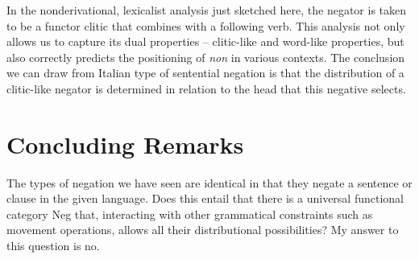 \documentclass[output=paper]{langsci/langscibook}
\begin{document}
\begin{exe}
\ex \begin{xlist}
\end{xlist}
\end{exe}

In the nonderivational, lexicalist analysis just sketched here,
the negator is taken to be a functor clitic that combines
with a following verb. This analysis
not only allows us to capture its dual properties -- clitic-like and
word-like properties, but also
correctly predicts the positioning of {\it non} in various contexts.
The conclusion we can draw from Italian type of sentential negation
is that the distribution of a clitic-like negator is determined
in relation to the head that this negative selects.


\section{Concluding Remarks}


The types of negation we have seen are identical
in that they negate a sentence or clause in the given language.
Does this entail that there is a universal functional category Neg
that, interacting with other
grammatical constraints such as movement operations, allows all their
distributional possibilities?  My answer to this question is no.
\end{document}
